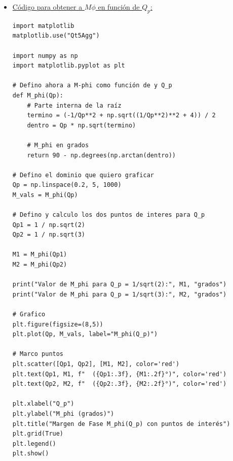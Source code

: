 \documentclass[12pt,a4paper]{article}
\begin{document}
\begin{itemize}
\begin{verbatim}
# Defino el dominio que quiero graficar
Qp = np.linspace(0.2, 5, 1000)
Omega_vals = Omega_G(Qp)
        
# Defino y calculo los dos puntos de interes para Q_p
Qp1 = 1 / np.sqrt(2)
Qp2 = 1 / np.sqrt(3)
        
Omega1 = Omega_G(Qp1)
Omega2 = Omega_G(Qp2)
        
print("Valor de Omega_G para Q_p = 1/sqrt(2):", Omega1)
print("Valor de Omega_G para Q_p = 1/sqrt(3):", Omega2)
        
# Grafico
plt.figure(figsize=(8,5))
plt.plot(Qp, Omega_vals, label="Omega_G(Q_p)")
        
# Marco puntos
plt.scatter([Qp1, Qp2], [Omega1, Omega2], color='red')
plt.text(Qp1, Omega1, f"  ({Qp1:.3f}, {Omega1:.3f})", color='red')
plt.text(Qp2, Omega2, f"  ({Qp2:.3f}, {Omega2:.3f})", color='red')
        
plt.xlabel("Q_p")
plt.ylabel("Omega_G")
plt.title("Omega_G(Q_p) con puntos de interés")
plt.grid(True)
plt.legend()
plt.show()
\end{verbatim}

\item \underline{Código para obtener a $M\phi$ en función de $Q_p$:}
\begin{verbatim}
import matplotlib
matplotlib.use("Qt5Agg")

import numpy as np
import matplotlib.pyplot as plt

# Defino ahora a M-phi como función de y Q_p
def M_phi(Qp):
    # Parte interna de la raíz
    termino = (-1/Qp**2 + np.sqrt((1/Qp**2)**2 + 4)) / 2
    dentro = Qp * np.sqrt(termino)

    # M_phi en grados
    return 90 - np.degrees(np.arctan(dentro))

# Defino el dominio que quiero graficar
Qp = np.linspace(0.2, 5, 1000)
M_vals = M_phi(Qp)

# Defino y calculo los dos puntos de interes para Q_p
Qp1 = 1 / np.sqrt(2)
Qp2 = 1 / np.sqrt(3)

M1 = M_phi(Qp1)
M2 = M_phi(Qp2)

print("Valor de M_phi para Q_p = 1/sqrt(2):", M1, "grados")
print("Valor de M_phi para Q_p = 1/sqrt(3):", M2, "grados")

# Grafico
plt.figure(figsize=(8,5))
plt.plot(Qp, M_vals, label="M_phi(Q_p)")

# Marco puntos
plt.scatter([Qp1, Qp2], [M1, M2], color='red')
plt.text(Qp1, M1, f"  ({Qp1:.3f}, {M1:.2f}°)", color='red')
plt.text(Qp2, M2, f"  ({Qp2:.3f}, {M2:.2f}°)", color='red')

plt.xlabel("Q_p")
plt.ylabel("M_phi (grados)")
plt.title("Margen de Fase M_phi(Q_p) con puntos de interés")
plt.grid(True)
plt.legend()
plt.show()
\end{verbatim}
\end{itemize}
    
\end{document}

